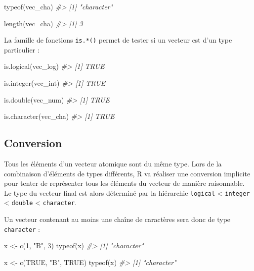 \documentclass[
  french,
]{scrbook}
\newenvironment{Shaded}{\begin{snugshade}}{\end{snugshade}}
\newcommand{\CommentTok}[1]{\textcolor[rgb]{0.56,0.35,0.01}{\textit{#1}}}
\newcommand{\ConstantTok}[1]{\textcolor[rgb]{0.00,0.00,0.00}{#1}}
\newcommand{\DecValTok}[1]{\textcolor[rgb]{0.00,0.00,0.81}{#1}}
\newcommand{\FunctionTok}[1]{\textcolor[rgb]{0.00,0.00,0.00}{#1}}
\newcommand{\NormalTok}[1]{#1}
\newcommand{\OtherTok}[1]{\textcolor[rgb]{0.56,0.35,0.01}{#1}}
\newcommand{\StringTok}[1]{\textcolor[rgb]{0.31,0.60,0.02}{#1}}
\begin{document}
\begin{Shaded}
\begin{Highlighting}[]
\FunctionTok{typeof}\NormalTok{(vec\_cha)}
\CommentTok{\#\textgreater{} [1] "character"}

\FunctionTok{length}\NormalTok{(vec\_cha)}
\CommentTok{\#\textgreater{} [1] 3}
\end{Highlighting}
\end{Shaded}

La famille de fonctions \texttt{is.*()} permet de tester si un vecteur est d'un type particulier :

\begin{Shaded}
\begin{Highlighting}[]
\FunctionTok{is.logical}\NormalTok{(vec\_log)}
\CommentTok{\#\textgreater{} [1] TRUE}

\FunctionTok{is.integer}\NormalTok{(vec\_int)}
\CommentTok{\#\textgreater{} [1] TRUE}

\FunctionTok{is.double}\NormalTok{(vec\_num)}
\CommentTok{\#\textgreater{} [1] TRUE}

\FunctionTok{is.character}\NormalTok{(vec\_cha)}
\CommentTok{\#\textgreater{} [1] TRUE}
\end{Highlighting}
\end{Shaded}

\hypertarget{conversion}{%
\subsection{Conversion}\label{conversion}}

Tous les éléments d'un vecteur atomique sont du même type. Lors de la combinaison d'éléments de types différents, R va réaliser une conversion implicite pour tenter de représenter tous les éléments du vecteur de manière raisonnable. Le type du vecteur final est alors déterminé par la hiérarchie \texttt{logical} \textless{} \texttt{integer} \textless{} \texttt{double} \textless{} \texttt{character}.

Un vecteur contenant au moins une chaîne de caractères sera donc de type \texttt{character} :

\begin{Shaded}
\begin{Highlighting}[]
\NormalTok{x }\OtherTok{\textless{}{-}} \FunctionTok{c}\NormalTok{(}\DecValTok{1}\NormalTok{, }\StringTok{"B"}\NormalTok{, }\DecValTok{3}\NormalTok{)}
\FunctionTok{typeof}\NormalTok{(x)}
\CommentTok{\#\textgreater{} [1] "character"}

\NormalTok{x }\OtherTok{\textless{}{-}} \FunctionTok{c}\NormalTok{(}\ConstantTok{TRUE}\NormalTok{, }\StringTok{"B"}\NormalTok{, }\ConstantTok{TRUE}\NormalTok{)}
\FunctionTok{typeof}\NormalTok{(x)}
\CommentTok{\#\textgreater{} [1] "character"}
\end{Highlighting}
\end{Shaded}
\end{document}
